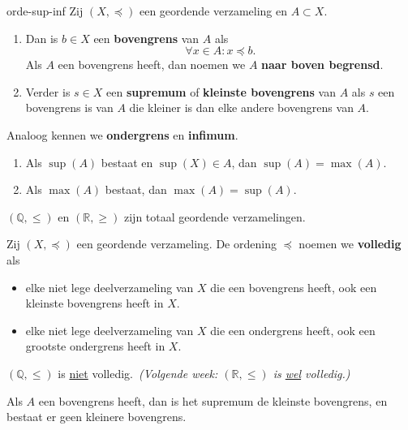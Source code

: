 \begin{definitie}{}{orde-sup-inf}
    Zij $(X, \preceq)$ een geordende verzameling en $A \subset X$.
    \begin{enumerate}[label = (\alph*)]
        \item Dan is $b \in X$ een \textbf{bovengrens} van $A$ als
            \[
                \forall x \in A: x \preceq b.
            \]
            Als $A$ een bovengrens heeft, dan noemen we $A$ \textbf{naar boven begrensd}.
        \item Verder is $s \in X$ een \textbf{supremum} of \textbf{kleinste bovengrens} van $A$ als $s$ een bovengrens is van $A$ die kleiner is dan elke andere bovengrens van $A$.
    \end{enumerate}
    Analoog kennen we \textbf{ondergrens} en \textbf{infimum}.
\end{definitie}
\begin{eigenschap}{}{}
    \begin{enumerate}
        \item Als \(\sup(A)\) bestaat en \(\sup(X) \in A\), dan \(\sup(A) = \max(A)\).
        \item Als \(\max(A)\) bestaat, dan \(\max(A) = \sup(A)\).
    \end{enumerate}
\end{eigenschap}
\begin{voorbeeld}{}{}
    \( (\mathbb{Q}, \leq) \text{ en } (\mathbb{R}, \geq) \) zijn totaal geordende verzamelingen.
\end{voorbeeld}
\begin{definitie}{}{}
    Zij \( (X, \preceq) \) een geordende verzameling.
    De ordening \(\preceq\) noemen we \textbf{volledig} als
    \begin{itemize}
        \item elke niet lege deelverzameling van $X$ die een bovengrens heeft, ook een kleinste bovengrens heeft in $X$.
        \item elke niet lege deelverzameling van $X$ die een ondergrens heeft, ook een grootste ondergrens heeft in $X$.
    \end{itemize}
\end{definitie}
\begin{opmerking}{}{}
    \( (\mathbb{Q}, \leq) \) is \underline{niet} volledig.\ \textit{(Volgende week: \((\mathbb{R}, \leq)\) is \underline{wel} volledig.)}
\end{opmerking}
\begin{stelling}{}{}
    Als $A$ een bovengrens heeft, dan is het supremum de kleinste bovengrens, en bestaat er geen kleinere bovengrens.
\end{stelling}
